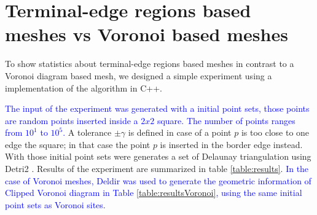 \documentclass[pdflatex,sn-mathphys]{sn-jnl}%
\theoremstyle{thmstyleone}%
\theoremstyle{thmstyletwo}%
\theoremstyle{thmstylethree}%
\begin{document}








\section{Terminal-edge regions based meshes vs Voronoi based meshes}
\label{sec:experimental_evaluation}

To show statistics about terminal-edge regions based meshes in contrast to a Voronoi diagram based mesh, we designed a simple experiment using a implementation of the algorithm in C++. 

\textcolor{blue}{The input of the experiment was generated with a initial point sets, those points are random points inserted inside a $2x2$ square. The number of points ranges from $10^1$ to $10^5$.} A tolerance $\pm \gamma$ is defined in case of a point $p$ is too close to one edge the square; in that case the point $p$ is inserted in the border edge instead. With those initial point sets were generates a set of Delaunay triangulation using Detri2 \cite{Detri2}. Results of the experiment are summarized in table \ref{table:results}. \textcolor{blue}{In the case of Voronoi meshes, Deldir \cite{deldir} was used to generate the geometric information of Clipped Voronoi diagram in Table \ref{table:resultsVoronoi}, using the same initial point sets as Voronoi sites.}
\end{document}
